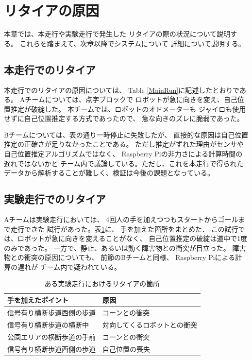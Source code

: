 \documentclass[twocolumn,9pt]{jsproceedings}
\begin{document}

\section{リタイアの原因}

本章では、本走行や実験走行で発生した
リタイアの際の状況について説明する。
これらを踏まえて、次章以降でシステムについて
詳細について説明する。

\subsection{本走行でのリタイア}


本走行でのリタイアの原因については、
Table \ref{MainRun}に記述したとおりである。
Aチームについては、点字ブロックで
ロボットが急に向きを変え、自己位置推定が破綻した。
本チームでは、ロボットのオドメーターも
ジャイロも使用せずに自己位置推定する方式であったので、
急な向きのズレに脆弱であった。

Bチームについては、表の通り一時停止に失敗したが、
直接的な原因は自己位置推定の正確さが足りなかったことである。
ただし推定がずれた理由がセンサや自己位置推定アルゴリズムではなく、
Raspberry Piの非力さによる計算時間の遅れではないかと
チーム内で議論している。ただし、これを本走行で得られた
データから解析することが難しく、検証は今後の課題となっている。

\subsection{実験走行でのリタイア}


Aチームは実験走行においては、
4回人の手を加えつつもスタートからゴールまで走行できた
試行があった。表\ref{4hands}に、
手を加えた箇所をまとめた．
この試行では、ロボットが急に向きを変えることがなく、
自己位置推定の破綻は道中で1度のみであった。
一方で、静止、あるいは動く障害物との衝突が目立った。
障害物との衝突の原因についても、
前節のBチームと同様、
Raspberry Piによる計算の遅れが
チーム内で疑われている。

\begin{table}[h]
  \caption{ある実験走行におけるリタイアの箇所}
  \label{4hands}
	\begin{tabular}{|l|p{3.5cm}|}
    \hline
    手を加えたポイント & 原因 \\
    \hline
    信号有り横断歩道西側の歩道 & コーンとの衝突 \\
    \hline
    信号有り横断歩道の横断中 & 対向してくるロボットとの衝突 \\ 
    \hline
    公園エリアの横断歩道の手前 & コーンとの衝突 \\ 
    \hline
    信号有り横断歩道西側の歩道 & 自己位置の喪失 \\ 
    \hline
  \end{tabular}
\end{table}
\end{document}

